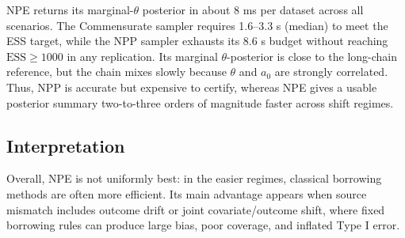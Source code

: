 NPE returns its marginal-$\theta$ posterior in about 8 ms per dataset across
all scenarios. The Commensurate sampler requires 1.6--3.3 s (median) to meet
the ESS target, while the NPP sampler exhausts its 8.6 s budget without
reaching $\mathrm{ESS}\ge 1000$ in any replication. Its marginal
$\theta$-posterior is close to the long-chain reference, but the chain mixes
slowly because $\theta$ and $a_0$ are strongly correlated. Thus, NPP is
accurate but expensive to certify, whereas NPE gives a usable posterior summary
two-to-three orders of magnitude faster across shift regimes.


\subsection{Interpretation}
Overall, NPE is not uniformly best: in the easier regimes, classical borrowing
methods are often more efficient. Its main advantage appears when source
mismatch includes outcome drift or joint covariate/outcome shift, where fixed
borrowing rules can produce large bias, poor coverage, and inflated Type I
error.
\FloatBarrier
